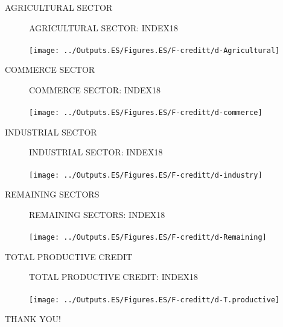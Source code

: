 \documentclass{beamer}
\begin{document}
%
\begin{frame}
	AGRICULTURAL SECTOR
\end{frame}
%
\begin{frame}
	\begin{figure}
		\centering
		AGRICULTURAL SECTOR: INDEX18\\~\\
		\texttt{[image: ../Outputs.ES/Figures.ES/F-creditt/d-Agricultural]}
	\end{figure}
\end{frame}
%
\begin{frame}
	COMMERCE SECTOR
\end{frame}
%
\begin{frame}
	\begin{figure}
		\centering
		COMMERCE SECTOR: INDEX18\\~\\
		\texttt{[image: ../Outputs.ES/Figures.ES/F-creditt/d-commerce]}
	\end{figure}
\end{frame}
%
\begin{frame}
	INDUSTRIAL SECTOR
\end{frame}
%
\begin{frame}
	\begin{figure}
		\centering
		INDUSTRIAL SECTOR: INDEX18\\~\\
		\texttt{[image: ../Outputs.ES/Figures.ES/F-creditt/d-industry]}
	\end{figure}
\end{frame}
%
\begin{frame}
	REMAINING SECTORS
\end{frame}
%
\begin{frame}
	\begin{figure}
		\centering
		REMAINING SECTORS: INDEX18\\~\\
		\texttt{[image: ../Outputs.ES/Figures.ES/F-creditt/d-Remaining]}
	\end{figure}
\end{frame}
%
\begin{frame}
	TOTAL PRODUCTIVE CREDIT
\end{frame}
%
\begin{frame}
	\begin{figure}
		\centering
		TOTAL PRODUCTIVE CREDIT: INDEX18\\~\\
		\texttt{[image: ../Outputs.ES/Figures.ES/F-creditt/d-T.productive]}
	\end{figure}
\end{frame}
%
\begin{frame}
	
	THANK YOU!
	
\end{frame}
\end{document}
